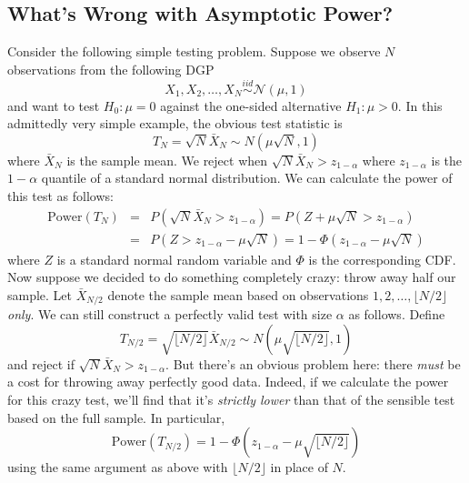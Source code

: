 \documentclass[12pt]{article}
\theoremstyle{definition}
\begin{document}
\subsection{What's Wrong with Asymptotic Power?}
Consider the following simple testing problem. Suppose we observe $N$ observations from the following DGP
$$X_1, X_2, \hdots, X_{N} \overset{iid}{\sim} \mathcal{N}(\mu, 1)$$
and want to test $H_0\colon \mu = 0$ against the one-sided alternative $H_1\colon \mu >0$. In this admittedly very simple example, the obvious test statistic is 
	$$T_{N} = \sqrt{N} \bar{X}_{N} \sim N\left(\mu \sqrt{N}, 1\right)$$
where $\bar{X}_{N}$ is the sample mean. We reject when $\sqrt{N} \bar{X}_{N}>z_{1-\alpha}$ where $z_{1-\alpha}$ is the $1-\alpha$ quantile of a standard normal distribution. We can calculate the power of this test as follows:
\begin{eqnarray*}
\mbox{Power}(T_{N}) &=& P\left(\sqrt{N} \bar{X}_{N}>z_{1-\alpha}\right) = P\left(Z + \mu\sqrt{N} >z_{1-\alpha}\right)\\
	&=&P\left(Z >z_{1-\alpha} - \mu\sqrt{N}\right) = 1 - \Phi\left(z_{1-\alpha} - \mu\sqrt{N}\right)
\end{eqnarray*}
where $Z$ is a standard normal random variable and $\Phi$ is the corresponding CDF. Now suppose we decided to do something completely crazy: throw away half our sample. Let $\bar{X}_{N/2}$ denote the sample mean based on observations $1, 2, \hdots, \lfloor N/2 \rfloor $ \emph{only}. We can still construct a perfectly valid test with size $\alpha$ as follows. Define
	$$T_{N/2} = \sqrt{\lfloor N/2 \rfloor } \bar{X}_{N/2} \sim N\left(\mu \sqrt{\lfloor N/2 \rfloor }, 1\right)$$
and reject if $\sqrt{N} \bar{X}_N > z_{1-\alpha}$. But there's an obvious problem here: there \emph{must} be a cost for throwing away perfectly good data. Indeed, if we calculate the power for this crazy test, we'll find that it's \emph{strictly lower} than that of the sensible test based on the full sample. In particular,
	$$\mbox{Power}(T_{N/2}) = 1 - \Phi\left(z_{1-\alpha} - \mu\sqrt{\lfloor N/2 \rfloor }\right)$$
using the same argument as above with $\lfloor N/2 \rfloor $ in place of $N$.  
\end{document}
